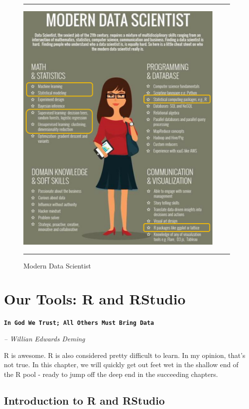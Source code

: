 \documentclass[11pt, letterpaper, twoside]{memoir}\usepackage{knitr}
\newcommand{\chapterendsymbol}{
    \vspace{24pt}
    \Huge
    \hrulefill \hspace{0.1in} \hspace{0.1in} \hrulefill
    \normalsize
    }
\begin{document}
\begin{figure}
\rule{4in}{1pt}
\centering
\includegraphics[height=5in]{images/datascientist.png}
\caption{Modern Data Scientist}
\label{fig:datascientist}
\rule{4in}{1pt}
\end{figure}

\chapterendsymbol





\chapter{Our Tools: R and RStudio}

\begin{flushright}
\textbf{\texttt{In God We Trust; All Others Must Bring Data}}

\emph{-- Willian Edwards Deming}
\end{flushright}

\vspace{12pt}

R is awesome. R is also considered pretty difficult to learn. In my opinion, that's not true. In this chapter, we will quickly get out feet wet in the shallow end of the R pool - ready to jump off the deep end in the succeeding chapters.

\section{Introduction to R and RStudio}
\end{document}
